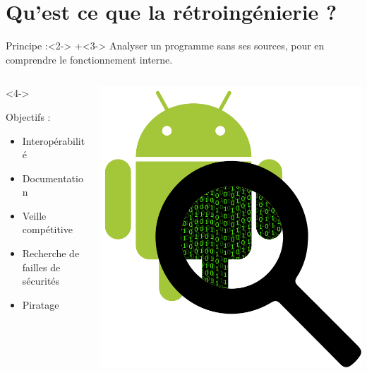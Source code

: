 \documentclass[11pt,aspectratio=1610]{beamer}%
\begin{document}
 
\section{Qu'est ce que la rétroingénierie ?}
  \begin{frame}[t]
      \slidetitle[]
      \begin{block}{Principe :}<2->
        \onslide+<3->{
        Analyser un programme sans ses sources, pour en comprendre le fonctionnement interne.
        }
      \end{block}
      \vfill
      \begin{columns}
        \begin{column}{.7\linewidth}<4->
          \begin{block}{Objectifs :}
            \begin{itemize}
            \item<5-> Interopérabilité
            \item<6-> Documentation
            \item<7-> Veille compétitive
            \item<8-> Recherche de failles de sécurités
            \item<9-> Piratage
            \end{itemize}
          \end{block}
        \end{column}
        \begin{column}{.25\linewidth}
          \centering
          \includegraphics[width=\linewidth]{android_loupe.png}
        \end{column}
      \end{columns}
      \vfill
  \end{frame}
\end{document}
